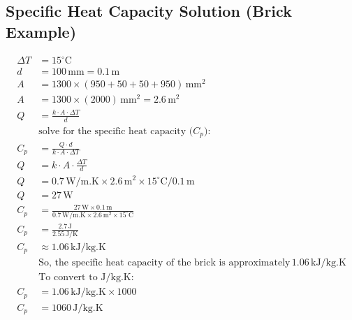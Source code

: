 \begin{theappendices}
\chapter{Specific Heat Capacity Solution (Brick Example)}
\begin{equation}
\begin{aligned}
\Delta T &= 15^\circ \text{C} \\
d &= 100 \, \text{mm} = 0.1 \, \text{m} \\
A &= 1300 \times (950 + 50 + 50 + 950) \, \text{mm}^2 \\
A &= 1300 \times (2000) \, \text{mm}^2 = 2.6 \, \text{m}^2 \\
Q &= \frac{k \cdot A \cdot \Delta T}{d} \\
&\text{solve for the specific heat capacity ($C_p$):} \\
C_p &= \frac{Q \cdot d}{k \cdot A \cdot \Delta T} \\
Q &= k \cdot A \cdot \frac{\Delta T}{d} \\
Q &= 0.7 \, \text{W/m.K} \times 2.6 \, \text{m}^2 \times 15^\circ \text{C} / 0.1 \, \text{m} \\
Q &= 27 \, \text{W} \\
C_p &= \frac{27 \, \text{W} \times 0.1 \, \text{m}}{0.7 \, \text{W/m.K} \times 2.6 \, \text{m}^2 \times 15^\circ \text{C}} \\
C_p &= \frac{2.7 \, \text{J}}{2.55 \, \text{J/K}} \\
C_p &\approx 1.06 \, \text{kJ/kg.K} \\
&\text{So, the specific heat capacity of the brick is approximately} \, 1.06 \, \text{kJ/kg.K} \\
&\text{To convert to J/kg.K:} \\
C_p &= 1.06 \, \text{kJ/kg.K} \times 1000 \\
C_p &= 1060 \, \text{J/kg.K}
\end{aligned}
\label{appendcp}
\end{equation}




































\end{theappendices}